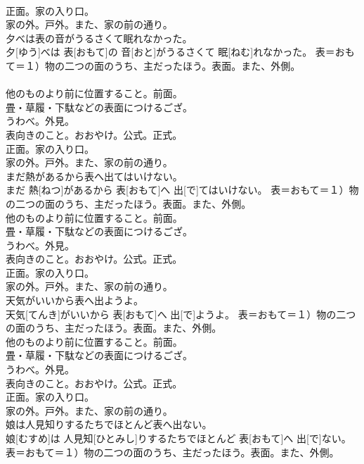 \documentclass[8pt]{extreport}
\begin{document}
\begin{CJK}{UTF8}{min}
{\\	正面。家の入り口。 　　　　　　
\\	家の外。戸外。また、家の前の通り。
\\	夕べは表の音がうるさくて眠れなかった。	
\\	夕[ゆう]べは 表[おもて]の 音[おと]がうるさくて 眠[ねむ]れなかった。	表＝おもて＝１）物の二つの面のうち、主だったほう。表面。また、外側。 　　　　　　
\\	他のものより前に位置すること。前面。 　　　　　　
\\	畳・草履・下駄などの表面につけるござ。 　　　　　　
\\	うわべ。外見。 　　　　　　
\\	表向きのこと。おおやけ。公式。正式。 　　　　　　
\\	正面。家の入り口。 　　　　　　
\\	家の外。戸外。また、家の前の通り。
\\	まだ熱があるから表へ出てはいけない。	
\\	まだ 熱[ねつ]があるから 表[おもて]へ 出[で]てはいけない。	表＝おもて＝１）物の二つの面のうち、主だったほう。表面。また、外側。 　　　　　　
\\	他のものより前に位置すること。前面。 　　　　　　
\\	畳・草履・下駄などの表面につけるござ。 　　　　　　
\\	うわべ。外見。 　　　　　　
\\	表向きのこと。おおやけ。公式。正式。 　　　　　　
\\	正面。家の入り口。 　　　　　　
\\	家の外。戸外。また、家の前の通り。
\\	天気がいいから表へ出ようよ。	
\\	天気[てんき]がいいから 表[おもて]へ 出[で]ようよ。	表＝おもて＝１）物の二つの面のうち、主だったほう。表面。また、外側。 　　　　　　
\\	他のものより前に位置すること。前面。 　　　　　　
\\	畳・草履・下駄などの表面につけるござ。 　　　　　　
\\	うわべ。外見。 　　　　　　
\\	表向きのこと。おおやけ。公式。正式。 　　　　　　
\\	正面。家の入り口。 　　　　　　
\\	家の外。戸外。また、家の前の通り。
\\	娘は人見知りするたちでほとんど表へ出ない。	
\\	娘[むすめ]は 人見知[ひとみし]りするたちでほとんど 表[おもて]へ 出[で]ない。	表＝おもて＝１）物の二つの面のうち、主だったほう。表面。また、外側。 　　　　　　
}
\end{CJK}
\end{document}
